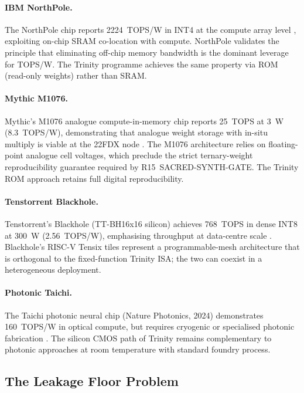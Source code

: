 \paragraph{IBM NorthPole.}  The NorthPole chip reports 2224~TOPS/W in
INT4 at the compute array level \cite{ibm_northpole_2023}, exploiting
on-chip SRAM co-location with compute.  NorthPole validates the principle
that eliminating off-chip memory bandwidth is the dominant leverage for
TOPS/W.  The Trinity programme achieves the same property via ROM
(read-only weights) rather than SRAM.

\paragraph{Mythic M1076.}  Mythic's M1076 analogue compute-in-memory
chip reports 25~TOPS at 3~W (8.3~TOPS/W), demonstrating that analogue
weight storage with in-situ multiply is viable at the 22FDX node
\cite{mythic_m1076_2021}.  The M1076 architecture relies on floating-point
analogue cell voltages, which preclude the strict ternary-weight
reproducibility guarantee required by R15~SACRED-SYNTH-GATE.  The Trinity
ROM approach retains full digital reproducibility.

\paragraph{Tenstorrent Blackhole.}  Tenstorrent's Blackhole
(TT-BH16x16 silicon) achieves 768~TOPS in dense INT8 at 300~W (2.56~TOPS/W),
emphasising throughput at data-centre scale \cite{tenstorrent_blackhole_2025}.
Blackhole's RISC-V Tensix tiles represent a programmable-mesh architecture
that is orthogonal to the fixed-function Trinity ISA; the two can coexist in
a heterogeneous deployment.

\paragraph{Photonic Taichi.}  The Taichi photonic neural chip (Nature
Photonics, 2024) demonstrates 160~TOPS/W in optical compute, but requires
cryogenic or specialised photonic fabrication \cite{photonic_taichi_2024}.
The silicon CMOS path of Trinity remains complementary to photonic approaches
at room temperature with standard foundry process.

\subsection{The Leakage Floor Problem}

